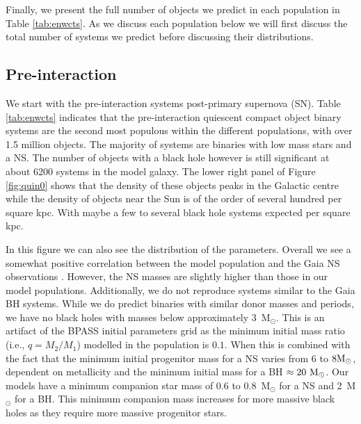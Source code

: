 \documentclass{pas}
\begin{document}
Finally, we present the full number of objects we predict in each population in Table \ref{tab:enwcts}. As we discuss each population below we will first discuss the total number of systems we predict before discussing their distributions. 

\subsection{Pre-interaction}\label{preint}
We start with the pre-interaction systems post-primary supernova (SN). Table \ref{tab:enwcts} indicates that the pre-interaction quiescent compact object binary systems are the second most populous within the different populations, with over 1.5 million objects. The majority of systems are binaries with low mass stars and a NS. The number of objects with a black hole however is still significant at about 6200 systems in the model galaxy. The lower right panel of Figure \ref{fig:quin0} shows that the density of these objects peaks in the Galactic centre while the density of objects near the Sun is of the order of several hundred per square kpc. With maybe a few to several black hole systems expected per square kpc. 

In this figure we can also see the distribution of the parameters. Overall we see a somewhat positive correlation between the model population and the Gaia NS observations \citep{elbadry2024populationneutronstarcandidates}. However, the NS masses are slightly higher than those in our model populations. Additionally, we do not reproduce systems similar to the Gaia BH systems. While we do predict binaries with similar donor masses and periods, we have no black holes with masses below approximately 3~M$_{\odot}$. This is an artifact of the \textsc{BPASS} initial parameters grid as the minimum initial mass ratio (i.e., $q=M_2/M_1$) modelled in the population is $0.1$. When this is combined with the fact that the minimum initial progenitor mass for a NS varies from 6 to $8\rm{M_{\odot}}$, dependent on metallicity and the minimum initial mass for a BH $\approx 20~\rm{M_{\odot}}$. Our models have a minimum companion star mass of 0.6 to 0.8~M$_{\odot}$ for a NS and 2~M$_{\odot}$ for a BH. This minimum companion mass increases for more massive black holes as they require more massive progenitor stars. 
\end{document}
